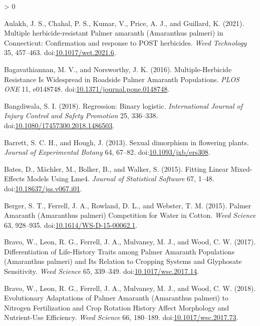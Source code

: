 \documentclass[utf8]{frontiersSCNS}
\newlength{\cslhangindent}
\newenvironment{CSLReferences}[2] %
 {%
  \setlength{\parindent}{0pt}
  \ifodd #1 \everypar{\setlength{\hangindent}{\cslhangindent}}\ignorespaces\fi
  \ifnum #2 > 0
  \setlength{\parskip}{#2\baselineskip}
  \fi
 }%
 {}
\begin{document}
\hypertarget{refs}{}
\begin{CSLReferences}{1}{0}
\leavevmode\hypertarget{ref-aulakh2021}{}%
Aulakh, J. S., Chahal, P. S., Kumar, V., Price, A. J., and Guillard, K.
(2021). Multiple herbicide-resistant {Palmer} amaranth ({Amaranthus}
palmeri) in {Connecticut}: Confirmation and response to {POST}
herbicides. \emph{Weed Technology} 35, 457--463.
doi:\href{https://doi.org/10.1017/wet.2021.6}{10.1017/wet.2021.6}.

\leavevmode\hypertarget{ref-bagavathiannan2016}{}%
Bagavathiannan, M. V., and Norsworthy, J. K. (2016). Multiple-{Herbicide
Resistance Is Widespread} in {Roadside Palmer Amaranth Populations}.
\emph{PLOS ONE} 11, e0148748.
doi:\href{https://doi.org/10.1371/journal.pone.0148748}{10.1371/journal.pone.0148748}.

\leavevmode\hypertarget{ref-bangdiwala2018}{}%
Bangdiwala, S. I. (2018). Regression: Binary logistic.
\emph{International Journal of Injury Control and Safety Promotion} 25,
336--338.
doi:\href{https://doi.org/10.1080/17457300.2018.1486503}{10.1080/17457300.2018.1486503}.

\leavevmode\hypertarget{ref-barrett2013}{}%
Barrett, S. C. H., and Hough, J. (2013). Sexual dimorphism in flowering
plants. \emph{Journal of Experimental Botany} 64, 67--82.
doi:\href{https://doi.org/10.1093/jxb/ers308}{10.1093/jxb/ers308}.

\leavevmode\hypertarget{ref-bates2015}{}%
Bates, D., Mächler, M., Bolker, B., and Walker, S. (2015). Fitting
{Linear Mixed}-{Effects Models Using} Lme4. \emph{Journal of Statistical
Software} 67, 1--48.
doi:\href{https://doi.org/10.18637/jss.v067.i01}{10.18637/jss.v067.i01}.

\leavevmode\hypertarget{ref-berger2015}{}%
Berger, S. T., Ferrell, J. A., Rowland, D. L., and Webster, T. M.
(2015). Palmer {Amaranth} ({Amaranthus} palmeri) {Competition} for
{Water} in {Cotton}. \emph{Weed Science} 63, 928--935.
doi:\href{https://doi.org/10.1614/WS-D-15-00062.1}{10.1614/WS-D-15-00062.1}.

\leavevmode\hypertarget{ref-bravo2017}{}%
Bravo, W., Leon, R. G., Ferrell, J. A., Mulvaney, M. J., and Wood, C. W.
(2017). Differentiation of {Life}-{History Traits} among {Palmer
Amaranth Populations} ({Amaranthus} palmeri) and {Its Relation} to
{Cropping Systems} and {Glyphosate Sensitivity}. \emph{Weed Science} 65,
339--349.
doi:\href{https://doi.org/10.1017/wsc.2017.14}{10.1017/wsc.2017.14}.

\leavevmode\hypertarget{ref-bravo2018}{}%
Bravo, W., Leon, R. G., Ferrell, J. A., Mulvaney, M. J., and Wood, C. W.
(2018). Evolutionary {Adaptations} of {Palmer Amaranth} ({Amaranthus}
palmeri) to {Nitrogen Fertilization} and {Crop Rotation History Affect
Morphology} and {Nutrient}-{Use Efficiency}. \emph{Weed Science} 66,
180--189.
doi:\href{https://doi.org/10.1017/wsc.2017.73}{10.1017/wsc.2017.73}.


\end{CSLReferences}
\end{document}
